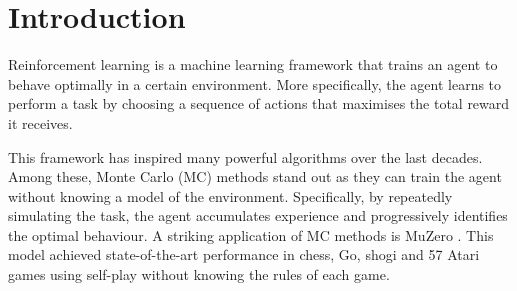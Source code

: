 
\chapter{Introduction}  %

\ifpdf
    \graphicspath{{Chapter1/Figs/Raster/}{Chapter1/Figs/PDF/}{Chapter1/Figs/}}
\else
    \graphicspath{{Chapter1/Figs/Vector/}{Chapter1/Figs/}}
\fi


\vspace{-1cm}


Reinforcement learning is a machine learning framework that trains an agent to behave optimally in a certain environment. More specifically, the agent learns to perform a task by choosing a sequence of actions that maximises the total reward it receives.

\vspace{-0.1cm}



This framework has inspired many powerful algorithms over the last decades.
Among these, Monte Carlo (MC) methods stand out as they can train the agent without
knowing a model of the environment. 
Specifically, by repeatedly simulating the task, the agent accumulates experience and progressively identifies the optimal behaviour.
A striking application of MC methods is MuZero \citep{Schrittwieser2020MasteringModel}. This model achieved state-of-the-art performance in chess, Go, shogi and 57 Atari games using self-play without knowing the rules of each game.


